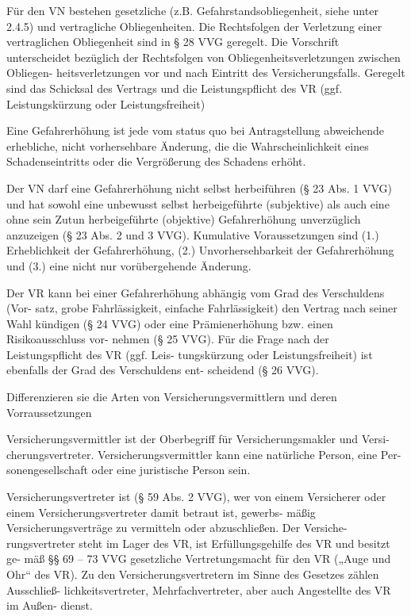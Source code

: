 Für den VN bestehen gesetzliche (z.B. Gefahrstandsobliegenheit, siehe unter
2.4.5) und vertragliche Obliegenheiten. Die Rechtsfolgen der Verletzung einer
vertraglichen Obliegenheit sind in § 28 VVG geregelt. Die Vorschrift unterscheidet
bezüglich der Rechtsfolgen von Obliegenheitsverletzungen zwischen Obliegen-
heitsverletzungen vor und nach Eintritt des Versicherungsfalls. Geregelt sind das
Schicksal des Vertrags und die Leistungspflicht des VR (ggf. Leistungskürzung oder
Leistungsfreiheit)

Eine Gefahrerhöhung ist jede vom status quo bei Antragstellung abweichende erhebliche, nicht vorhersehbare Änderung, 
die die Wahrscheinlichkeit eines Schadenseintritts oder die Vergrößerung des Schadens erhöht.

Der VN darf eine Gefahrerhöhung nicht selbst herbeiführen (§ 23 Abs. 1 VVG) und
hat sowohl eine unbewusst selbst herbeigeführte (subjektive) als auch eine ohne
sein Zutun herbeigeführte (objektive) Gefahrerhöhung unverzüglich anzuzeigen (§
23 Abs. 2 und 3 VVG). Kumulative Voraussetzungen sind (1.) Erheblichkeit der
Gefahrerhöhung, (2.) Unvorhersehbarkeit der Gefahrerhöhung und (3.) eine nicht
nur vorübergehende Änderung.

Der VR kann bei einer Gefahrerhöhung abhängig vom Grad des Verschuldens (Vor-
satz, grobe Fahrlässigkeit, einfache Fahrlässigkeit) den Vertrag nach seiner Wahl
kündigen (§ 24 VVG) oder eine Prämienerhöhung bzw. einen Risikoausschluss vor-
nehmen (§ 25 VVG). Für die Frage nach der Leistungspflicht des VR (ggf. Leis-
tungskürzung oder Leistungsfreiheit) ist ebenfalls der Grad des Verschuldens ent-
scheidend (§ 26 VVG).


Differenzieren sie die Arten von Versicherungsvermittlern und deren Vorraussetzungen

Versicherungsvermittler ist der Oberbegriff für Versicherungsmakler und Versi-
cherungsvertreter. Versicherungsvermittler kann eine natürliche Person, eine Per-
sonengesellschaft oder eine juristische Person sein.

Versicherungsvertreter ist (§ 59 Abs. 2 VVG), wer von
einem Versicherer oder einem Versicherungsvertreter damit betraut ist, gewerbs-
mäßig Versicherungsverträge zu vermitteln oder abzuschließen. Der Versiche-
rungsvertreter steht im Lager des VR, ist Erfüllungsgehilfe des VR und besitzt ge-
mäß §§ 69 – 73 VVG gesetzliche Vertretungsmacht für den VR („Auge und Ohr“
des VR). Zu den Versicherungsvertretern im Sinne des Gesetzes zählen Ausschließ-
lichkeitsvertreter, Mehrfachvertreter, aber auch Angestellte des VR im Außen-
dienst.

